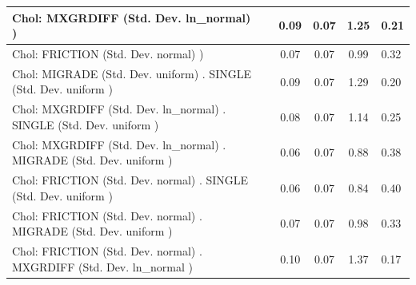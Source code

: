 \begin{table}
\begin{center}
\begin{tabular}{|l|l|c|c|c|l|}
			 Chol: MXGRDIFF (Std. Dev. ln_normal) ) &  & 0.09 & 0.07 & 1.25 & 0.21 \\
			\hline
			 Chol: FRICTION (Std. Dev. normal) ) &  & 0.07 & 0.07 & 0.99 & 0.32 \\
			\hline
			 Chol: MIGRADE (Std. Dev. uniform) . SINGLE (Std. Dev.   uniform ) &  & 0.09 & 0.07 & 1.29 & 0.20 \\
			\hline
			 Chol: MXGRDIFF (Std. Dev. ln_normal) . SINGLE (Std. Dev.   uniform ) &  & 0.08 & 0.07 & 1.14 & 0.25 \\
			\hline
			 Chol: MXGRDIFF (Std. Dev. ln_normal) . MIGRADE (Std. Dev.   uniform ) &  & 0.06 & 0.07 & 0.88 & 0.38 \\
			\hline
			 Chol: FRICTION (Std. Dev. normal) . SINGLE (Std. Dev.   uniform ) &  & 0.06 & 0.07 & 0.84 & 0.40 \\
			\hline
			 Chol: FRICTION (Std. Dev. normal) . MIGRADE (Std. Dev.   uniform ) &  & 0.07 & 0.07 & 0.98 & 0.33 \\
			\hline
			 Chol: FRICTION (Std. Dev. normal) . MXGRDIFF (Std. Dev.   ln_normal ) &  & 0.10 & 0.07 & 1.37 & 0.17 \\
			\hline
		\end{tabular}
	\end{center}
\end{table}